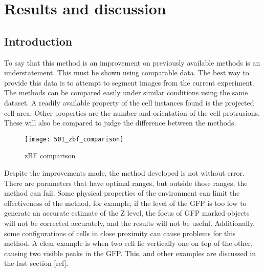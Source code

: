 
\chapter{Results and discussion}

\ifpdf
    \graphicspath{{Chapter5/Figs/Raster/}{Chapter5/Figs/PDF/}{Chapter5/Figs/}}
\else
    \graphicspath{{Chapter5/Figs/Vector/}{Chapter5/Figs/}}
\fi

\section{Introduction}

To say that this method is an improvement on previously available methods is an understatement. This must be shown using comparable data. The best way to provide this data is to attempt to segment images from the current experiment. The methods can be compared easily under similar conditions using the same dataset. A readily available property of the cell instances found is the projected cell area. Other properties are the number and orientation of the cell protrusions. These will also be compared to judge the difference between the methods.

\begin{figure}[p]
 \centering
 \texttt{[image: 501\_zbf\_comparison]}
 \caption{
 	zBF comparison
 }
 \label{fig:zbfcomparison}
\end{figure}

Despite the improvements made, the method developed is not without error. There are parameters that have optimal ranges, but outside those ranges, the method can fail. Some physical properties of the environment can limit the effectiveness of the method, for example, if the level of the GFP is too low to generate an accurate estimate of the Z level, the focus of GFP marked objects will not be corrected accurately, and the results will not be useful. Additionally, some configurations of cells in close proximity can cause problems for this method. A clear example is when two cell lie vertically one on top of the other, causing two visible peaks in the GFP. This, and other examples are discussed in the last section [ref].

